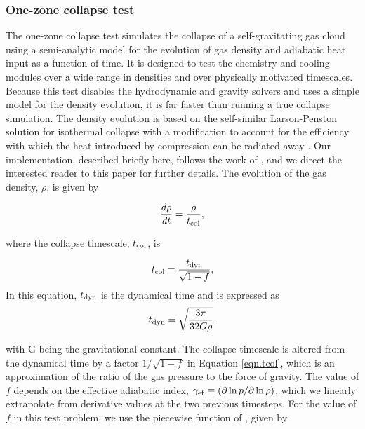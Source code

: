 \subsubsection{One-zone collapse test}
\label{sec.tests.1-zone}

The one-zone collapse test simulates the collapse of a
self-gravitating gas cloud using a semi-analytic model for the
evolution of gas density and adiabatic heat input as a function of
time.  It is designed to test the chemistry and cooling modules over a
wide range in densities and over physically motivated timescales.
Because this test disables the hydrodynamic and gravity solvers and
uses a simple model for the density evolution, it is far faster than
running a true collapse simulation.  The density evolution is based on
the self-similar Larson-Penston \citep{1969MNRAS.145..271L,
1969MNRAS.144..425P} solution for isothermal collapse with a
modification to account for the efficiency with which the heat
introduced by compression can be radiated away
\citep{1983ApJ...265.1047Y}.  Our implementation, described briefly
here, follows the work of \citet{2005ApJ...626..627O}, and we direct
the interested reader to this paper for further details.  The
evolution of the gas density, $\rho$, is given by

\begin{equation}
\frac{d\rho}{dt} = \frac{\rho}{t_{\rm col}},
\end{equation}

where the collapse timescale, $t_{\rm col}$, is

\begin{equation} \label{eqn.tcol}
t_{\rm col} = \frac{t_{\rm dyn}}{\sqrt{1 - f}},
\end{equation}
In this equation, $t_{\rm dyn}$ is the dynamical time and is expressed as
\begin{equation}
t_{\rm dyn} = \sqrt{\frac{3 \pi}{32 G \rho}}.
\end{equation}

with G being the gravitational constant.  The collapse timescale is
altered from the dynamical time by a factor $1/\sqrt{1-f}$ in Equation
\ref{eqn.tcol}, which is an approximation of the ratio of the gas
pressure to the force of gravity.  The value of $f$ depends on the
effective adiabatic index, $\gamma_{\rm ef} \equiv (\partial \ln p
/ \partial \ln \rho)$, which we linearly extrapolate
from derivative values at the two previous timesteps.  For the value
of $f$ in this test problem, we use the piecewise function of
\citet{2005ApJ...626..627O}, given by

